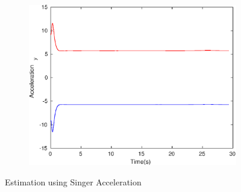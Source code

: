 \begin{figure}[h]
\begin{subfigure}{.5\linewidth}
\end{subfigure}
\begin{subfigure}{.5\linewidth}
\centering
\includegraphics[width=.9\linewidth]{figures/Frad/s3csSMAcceleration_y}
\end{subfigure}
\caption{Estimation using Singer Acceleration}
\end{figure}


